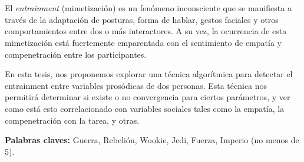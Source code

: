 \chapter*{\runtitulo}

\noindent El \emph{entrainment} (mimetización) es un fenómeno inconsciente que se manifiesta a través de la adaptación de posturas, forma de hablar, gestos faciales y otros comportamientos entre dos o más interactores. A su vez, la ocurrencia de esta mimetización está fuertemente emparentada con el sentimiento de empatía y compenetración entre los participantes.

En esta tesis, nos proponemos explorar una técnica algorítmica para detectar el entrainment entre variables prosódicas de dos personas. Esta técnica nos permitirá determinar si existe o no convergencia para ciertos parámetros, y ver como está esto correlacionado con variables sociales tales como la empatía, la compenetración con la tarea, y otras.

\bigskip

\noindent\textbf{Palabras claves:} Guerra, Rebelión, Wookie, Jedi, Fuerza, Imperio (no menos de 5).
